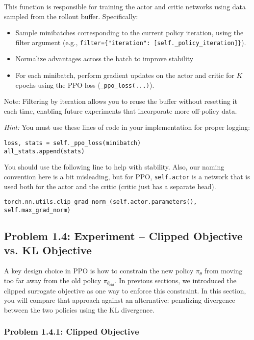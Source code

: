 \documentclass[12pt]{article}
\begin{document}
This function is responsible for training the actor and critic networks using data sampled from the rollout buffer. Specifically:
\begin{itemize}
    \item Sample minibatches corresponding to the current policy iteration, using the filter argument (e.g., \texttt{filter=\{"iteration": [self.\_policy\_iteration]\}}). 
    \item Normalize advantages across the batch to improve stability
    \item For each minibatch, perform gradient updates on the actor and critic for $K$ epochs using the PPO loss (\texttt{\_ppo\_loss(...)}).
\end{itemize}

\noindent
Note: Filtering by iteration allows you to reuse the buffer without resetting it each time, enabling future experiments that incorporate more off-policy data.

\textit{Hint:} You must use these lines of code in your implementation for proper logging:

\begin{verbatim}
loss, stats = self._ppo_loss(minibatch)
all_stats.append(stats)
\end{verbatim}

You should use the following line to help with stability.  Also, our naming convention here is a bit misleading, but for PPO, \texttt{self.actor} is a network that is used both for the actor and the critic (critic just has a separate head).  
\begin{verbatim}
torch.nn.utils.clip_grad_norm_(self.actor.parameters(), self.max_grad_norm)
\end{verbatim}


\newpage

\subsection*{Problem 1.4: Experiment – Clipped Objective vs. KL Objective}

A key design choice in PPO is how to constrain the new policy $\pi_\theta$ from moving too far away from the old policy $\pi_{\theta_{\text{old}}}$. In previous sections, we introduced the clipped surrogate objective as one way to enforce this constraint. In this section, you will compare that approach against an alternative: penalizing divergence between the two policies using the KL divergence.

\subsubsection*{Problem 1.4.1: Clipped Objective}
\end{document}
